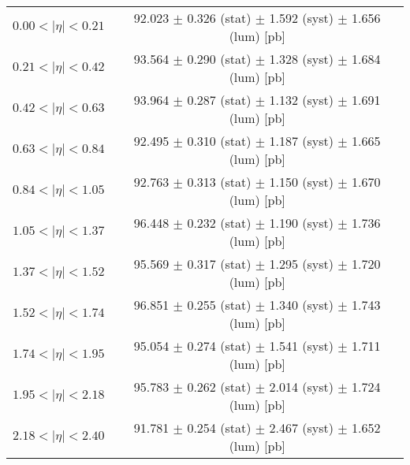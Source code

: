 \begin{tabular}{lc}
\hline
$0.00 < |\eta| <0.21$          & 92.023 $\pm$ 0.326 (stat) $\pm$ 1.592 (syst) $\pm$ 1.656 (lum) [pb]  \\
$0.21 < |\eta| <0.42$          & 93.564 $\pm$ 0.290 (stat) $\pm$ 1.328 (syst) $\pm$ 1.684 (lum) [pb]  \\
$0.42 < |\eta| <0.63$          & 93.964 $\pm$ 0.287 (stat) $\pm$ 1.132 (syst) $\pm$ 1.691 (lum) [pb]  \\
$0.63 < |\eta| <0.84$          & 92.495 $\pm$ 0.310 (stat) $\pm$ 1.187 (syst) $\pm$ 1.665 (lum) [pb]  \\
$0.84 < |\eta| <1.05$          & 92.763 $\pm$ 0.313 (stat) $\pm$ 1.150 (syst) $\pm$ 1.670 (lum) [pb]  \\
$1.05 < |\eta| <1.37$          & 96.448 $\pm$ 0.232 (stat) $\pm$ 1.190 (syst) $\pm$ 1.736 (lum) [pb]  \\
$1.37 < |\eta| <1.52$          & 95.569 $\pm$ 0.317 (stat) $\pm$ 1.295 (syst) $\pm$ 1.720 (lum) [pb]  \\
$1.52 < |\eta| <1.74$          & 96.851 $\pm$ 0.255 (stat) $\pm$ 1.340 (syst) $\pm$ 1.743 (lum) [pb]  \\
$1.74 < |\eta| <1.95$          & 95.054 $\pm$ 0.274 (stat) $\pm$ 1.541 (syst) $\pm$ 1.711 (lum) [pb]  \\
$1.95 < |\eta| <2.18$          & 95.783 $\pm$ 0.262 (stat) $\pm$ 2.014 (syst) $\pm$ 1.724 (lum) [pb]  \\
$2.18 < |\eta| <2.40$          & 91.781 $\pm$ 0.254 (stat) $\pm$ 2.467 (syst) $\pm$ 1.652 (lum) [pb]  \\
\hline
\end{tabular}
